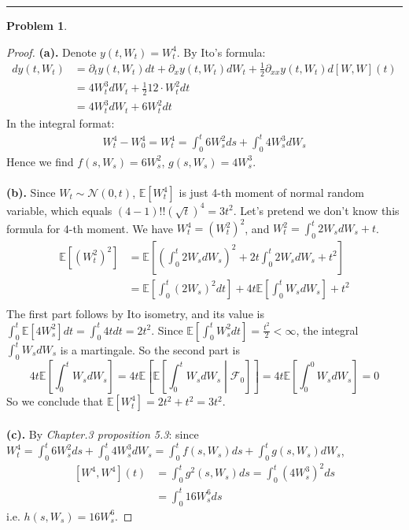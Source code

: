 \documentclass[a4paper, 10pt]{article}
\theoremstyle{definition}
\newtheorem{problem}{Problem}
\theoremstyle{hSol}
\begin{document}
\noindent\rule{16cm}{0.4pt}
\begin{problem}
\end{problem}
\begin{proof} \textbf{(a).} Denote $y(t, W_t) = W_t^4$.
By Ito's formula:
\begin{equation}
	\begin{split}
		dy(t,W_t) &= \partial_t y(t,W_t) dt +  \partial_x y(t,W_t) dW_t + \frac{1}{2} \partial_{xx} y(t,W_t) d[W, W](t)  \\
		&=  4W_t^3 dW_t + \frac{1}{2} 12 \cdot W_t^2dt \\
		&= 4W_t^3 dW_t +6W_t^2dt
	\end{split}
\end{equation}
In the integral format:
\begin{equation}
	\begin{split}
		W_t^4 - W_0^4  = W_t^4 = \int_0^t 6W_s^2ds+ \int_0^t 4W_s^3 dW_s 
	\end{split}
\end{equation}
Hence we find $f(s, W_s) = 6W_s^2$, $g(s, W_s) = 4W_s^3$.  \\
~\\
\textbf{(b).}  Since $W_t \sim \mathcal{N}(0, t)$, $\mathbb{E}\left[W_t^4\right]$ is just 4-th moment of normal random variable, which equals $(4-1)!!(\sqrt{t})^4 = 3t^2$. Let's pretend we don't know this formula for 4-th moment. We have $W^4_t = (W_t^2)^2$, and $W_t^2 = \int_0^t 2W_s dW_s + t$.
\begin{equation}
	\begin{split}
		\mathbb{E}\left[(W_t^2)^2\right] &= \mathbb{E}\left[\left(\int_0^t 2W_s dW_s\right)^2 + 2 t\int_0^t 2W_s dW_s + t^2\right] \\
		& = \mathbb{E}\left[\int_0^t (2W_s)^2 dt\right] + 4t \mathbb{E}\left[\int_0^t W_s dW_s\right] + t^2 \\
	\end{split}
\end{equation}
The first part follows by Ito isometry, and its value is $\int_0^t \mathbb{E}\left[4W_s^2\right] dt = \int_0^t 4t dt = 2t^2$. Since $\mathbb{E}\left[\int_0^t W_s^2 dt\right] = \frac{t^2}{2} < \infty$, the integral $\int_0^t W_s dW_s$ is a martingale. So the second part is
$$
4t \mathbb{E}\left[\int_0^t W_s dW_s\right] = 4t \mathbb{E}\left[\mathbb{E}\left[\int_0^t W_s dW_s\middle|\mathcal{F}_0\right]\right] = 4t \mathbb{E}\left[\int_0^0 W_s dW_s\right] = 0
$$
So we conclude that $\mathbb{E}\left[W_t^4\right] = 2t^2 + t^2 = 3t^2$.\\
~\\
\textbf{(c).} By \textit{Chapter.3 proposition 5.3}: since $ W_t^4 = \int_0^t 6W_s^2ds+ \int_0^t 4W_s^3 dW_s = \int_0^t f(s, W_s)ds+ \int_0^t g(s, W_s) dW_s$, 
\begin{equation}
	\begin{split}
		[W^4, W^4](t) &= \int_0^t g^2(s,W_s) ds= \int_0^t (4W_s^3)^2 ds \\
		&=\int_0^t 16W_s^6 ds
	\end{split}
\end{equation}
i.e. $h(s, W_s) = 16W_s^6$.
\end{proof}
\end{document}
